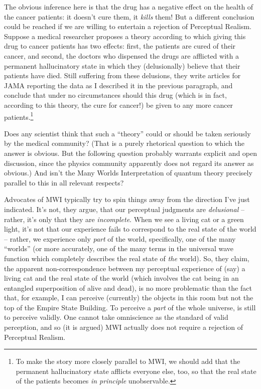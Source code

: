 \documentclass[12pt]{article}
\begin{document}
The obvious inference here is that the drug has a negative effect on
the health of the cancer patients:  it doesn't cure them, it
\emph{kills} them!  But a different conclusion could be reached if we
are willing to entertain a rejection of Perceptual Realism.  Suppose a
medical researcher proposes a theory according to which giving this
drug to cancer patients has two effects:  first, the patients are cured of
their cancer, and second, the doctors who dispensed the drugs are afflicted
with a permanent hallucinatory state in which they (delusionally)
believe that their patients have died.  Still suffering from these
delusions, they write articles for JAMA reporting the data as I
described it in the previous paragraph, and conclude that under no
circumstances should this drug (which is in fact, according to this
theory, the cure for cancer!) be given to any more cancer 
patients.\footnote{To make the story more closely parallel to MWI, we should
  add that the permanent hallucinatory state afflicts everyone else,
  too, so that the real state of the patients becomes \emph{in
    principle} unobservable.}

Does any scientist think that such a ``theory'' could or should
be taken seriously by the medical community?  (That is a purely
rhetorical question to which the answer is obvious.  But the following 
question probably warrants explicit and open discussion, since the
physics community apparently does not regard its answer as obvious.)  
And isn't the Many Worlds Interpretation of quantum theory precisely 
parallel to this in all relevant respects?

Advocates of MWI typically try to spin things away from the direction
I've just indicated.  It's not, they argue, that our perceptual
judgments are \emph{delusional} -- rather, it's only that they are
\emph{incomplete}.  When we see a living cat or a green light, it's
not that our experience fails to correspond to the real state of the
world -- rather, we experience only \emph{part} of the world,
specifically, one of the many ``worlds'' (or more accurately, one of
the many terms in the universal wave function which completely
describes the
real state of \emph{the} world).  So, they claim, the apparent
non-correspondence between my perceptual experience of (say) a living cat
and the real state of the world (which involves the cat being in an
entangled superposition of alive and dead), is no more problematic
than the fact that, for example, 
I can perceive (currently) the objects in this 
room but not the top of the Empire State Building.  To perceive a 
\emph{part} of the whole universe, is still to perceive validly.  One
cannot take omniscience as the standard of valid perception,
and so (it is argued) MWI actually does not require a rejection of
Perceptual Realism.
\end{document}
